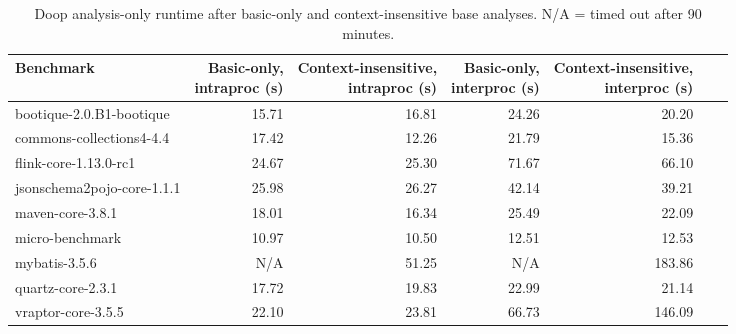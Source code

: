 \begin{table*}
	\centering
	\caption{Doop analysis-only runtime after basic-only and context-insensitive base analyses. N/A = timed out after 90 minutes.}
	\begin{tabular}{lrrrrrr}
		\toprule
		Benchmark & \thead{Basic-only, \\ intraproc (s)} & \thead{Context-insensitive, \\ intraproc (s)} & \thead{Basic-only, \\ interproc (s)}  & \thead{Context-insensitive, \\ interproc (s)}  \\
		\midrule
		bootique-2.0.B1-bootique           		& 15.71  & 16.81 &  24.26    &  20.20     \\
		commons-collections4-4.4           		& 17.42  & 12.26 &  21.79    &  15.36        \\
		flink-core-1.13.0-rc1           		& 24.67  & 25.30 &  71.67    &  66.10         \\
		jsonschema2pojo-core-1.1.1         		& 25.98  & 26.27 &  42.14    &  39.21         \\
		maven-core-3.8.1   		        	& 18.01  & 16.34 &  25.49    &  22.09          \\
		micro-benchmark         			& 10.97  & 10.50 &  12.51    &  12.53        \\
		mybatis-3.5.6         		  		&  N/A   & 51.25 &   N/A     & 183.86          \\
		quartz-core-2.3.1        	  		& 17.72  & 19.83 &  22.99    &  21.14        \\
		vraptor-core-3.5.5         	  		& 22.10  & 23.81 &  66.73    & 146.09       \\
		\bottomrule
	\end{tabular}
	\label{tab:doop-runtimes}
\end{table*}